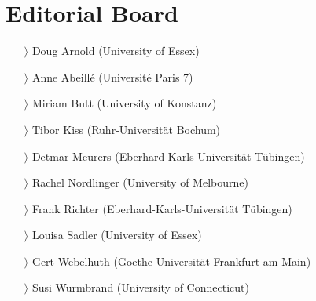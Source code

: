 \documentclass[
notumble,
nofoldmark,
]{leaflet}
\begin{document}
{    \section{Editorial Board}     
\begin{itemize}
    \item[$\rangle$] Doug Arnold (University of Essex)
    \item[$\rangle$] Anne Abeill\'e (Universit\'e Paris 7)
    \item[$\rangle$] Miriam Butt (University of Konstanz)
    \item[$\rangle$] Tibor Kiss (Ruhr-Universit\"at Bochum)
    \item[$\rangle$] Detmar Meurers (Eberhard-Karls-Universit\"at T\"ubingen)
    \item[$\rangle$] Rachel Nordlinger (University of Melbourne) 
    \item[$\rangle$] Frank Richter (Eberhard-Karls-Universit\"at T\"ubingen)
    \item[$\rangle$] Louisa Sadler (University of Essex)
    \item[$\rangle$] Gert Webelhuth (Goethe-Universit\"at Frankfurt am Main)
    \item[$\rangle$] Susi Wurmbrand (University of Connecticut)
    \end{itemize}}
\end{document}
